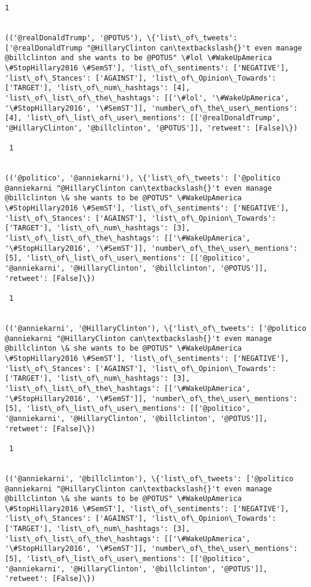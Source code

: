 \documentclass[11pt]{article}
\begin{document}
\begin{Verbatim}[commandchars=\\\{\}]
 1
 

(('@realDonaldTrump', '@POTUS'), \{'list\_of\_tweets': ['@realDonaldTrump "@HillaryClinton can\textbackslash{}'t even manage @billclinton and she wants to be @POTUS" \#lol \#WakeUpAmerica \#StopHillary2016 \#SemST'], 'list\_of\_sentiments': ['NEGATIVE'], 'list\_of\_Stances': ['AGAINST'], 'list\_of\_Opinion\_Towards': ['TARGET'], 'list\_of\_num\_hashtags': [4], 'list\_of\_list\_of\_the\_hashtags': [['\#lol', '\#WakeUpAmerica', '\#StopHillary2016', '\#SemST']], 'number\_of\_the\_user\_mentions': [4], 'list\_of\_list\_of\_user\_mentions': [['@realDonaldTrump', '@HillaryClinton', '@billclinton', '@POTUS']], 'retweet': [False]\})

 1
 

(('@politico', '@anniekarni'), \{'list\_of\_tweets': ['@politico @anniekarni "@HillaryClinton can\textbackslash{}'t even manage @billclinton \& she wants to be @POTUS" \#WakeUpAmerica \#StopHillary2016 \#SemST'], 'list\_of\_sentiments': ['NEGATIVE'], 'list\_of\_Stances': ['AGAINST'], 'list\_of\_Opinion\_Towards': ['TARGET'], 'list\_of\_num\_hashtags': [3], 'list\_of\_list\_of\_the\_hashtags': [['\#WakeUpAmerica', '\#StopHillary2016', '\#SemST']], 'number\_of\_the\_user\_mentions': [5], 'list\_of\_list\_of\_user\_mentions': [['@politico', '@anniekarni', '@HillaryClinton', '@billclinton', '@POTUS']], 'retweet': [False]\})

 1
 

(('@anniekarni', '@HillaryClinton'), \{'list\_of\_tweets': ['@politico @anniekarni "@HillaryClinton can\textbackslash{}'t even manage @billclinton \& she wants to be @POTUS" \#WakeUpAmerica \#StopHillary2016 \#SemST'], 'list\_of\_sentiments': ['NEGATIVE'], 'list\_of\_Stances': ['AGAINST'], 'list\_of\_Opinion\_Towards': ['TARGET'], 'list\_of\_num\_hashtags': [3], 'list\_of\_list\_of\_the\_hashtags': [['\#WakeUpAmerica', '\#StopHillary2016', '\#SemST']], 'number\_of\_the\_user\_mentions': [5], 'list\_of\_list\_of\_user\_mentions': [['@politico', '@anniekarni', '@HillaryClinton', '@billclinton', '@POTUS']], 'retweet': [False]\})

 1
 

(('@anniekarni', '@billclinton'), \{'list\_of\_tweets': ['@politico @anniekarni "@HillaryClinton can\textbackslash{}'t even manage @billclinton \& she wants to be @POTUS" \#WakeUpAmerica \#StopHillary2016 \#SemST'], 'list\_of\_sentiments': ['NEGATIVE'], 'list\_of\_Stances': ['AGAINST'], 'list\_of\_Opinion\_Towards': ['TARGET'], 'list\_of\_num\_hashtags': [3], 'list\_of\_list\_of\_the\_hashtags': [['\#WakeUpAmerica', '\#StopHillary2016', '\#SemST']], 'number\_of\_the\_user\_mentions': [5], 'list\_of\_list\_of\_user\_mentions': [['@politico', '@anniekarni', '@HillaryClinton', '@billclinton', '@POTUS']], 'retweet': [False]\})


\end{Verbatim}
\end{document}
